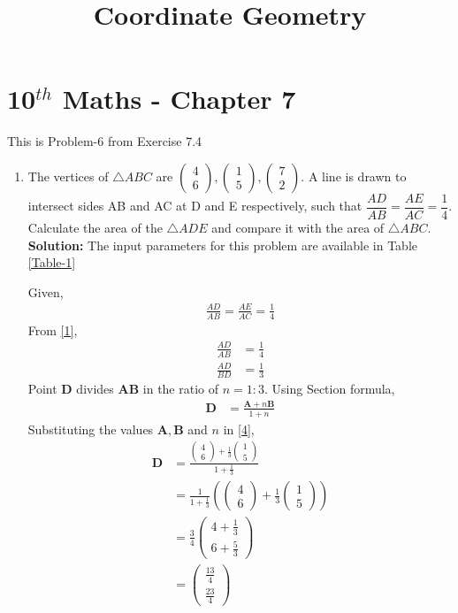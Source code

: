 \documentclass[12pt]{article}
\providecommand{\brak}[1]{\ensuremath{\left(#1\right)}}
\newcommand{\solution}{\noindent \textbf{Solution: }}
\newcommand{\myvec}[1]{\ensuremath{\begin{pmatrix}#1\end{pmatrix}}}
\let\vec\mathbf
\begin{document}
\begin{center}
\title{\textbf{Coordinate Geometry}}
\date{\vspace{-5ex}} %
\maketitle
\end{center}
\setcounter{page}{1}
\section*{10$^{th}$ Maths - Chapter 7}
This is Problem-6 from Exercise 7.4
\begin{enumerate}
\item The vertices of $\triangle ABC$ are $\myvec{4 \\ 6}, \myvec{1\\5}, \myvec{7\\2}$. A line is drawn to intersect sides AB and AC at D and E respectively, such that $\dfrac{AD}{AB}=\dfrac{AE}{AC}=\dfrac{1}{4}$. Calculate the area of the $\triangle ADE$ and compare it with the area of $\triangle ABC$.\\
\solution The input parameters for this problem are available in Table \eqref{Table-1}
\begin{table}[ht!]\centering

\caption{}
\label{Table-1}	
\end{table}

Given,
\begin{align}
\frac{AD}{AB}=\frac{AE}{AC}=\frac{1}{4}\label{1}
\end{align}
From \eqref{1},
\begin{align}
\frac{AD}{AB} &=\frac{1}{4}\\
\frac{AD}{BD} &=\frac{1}{3}
\end{align}
Point $\vec{D}$ divides $\vec{A}\vec{B}$ in the ratio of $n = 1:3$.
	Using Section formula,
\begin{align}
\vec{D} &=\frac{\vec{A}+n\vec{B}}{1+n}\label{4}
\end{align}
Substituting the values $\vec{A},\vec{B}$ and $n$ in \eqref{4},
\begin{align}
\vec{D} &=\frac{{\myvec{4\\6}+\frac{1}{3}\myvec{1\\5}}}{1+\frac{1}{3}}\\
	&=\frac{1}{1+\frac{1}{3}}\brak{{\myvec{4\\6}+\frac{1}{3}\myvec{1\\5}}} \\
	&=\frac{3}{4}\myvec{4+\frac{1}{3}\\[2pt]6+\frac{5}{3}}\\
	&=\myvec{\frac{13}{4}\\[2pt] \frac{23}{4}}
\end{align}


\end{enumerate}
\end{document}
